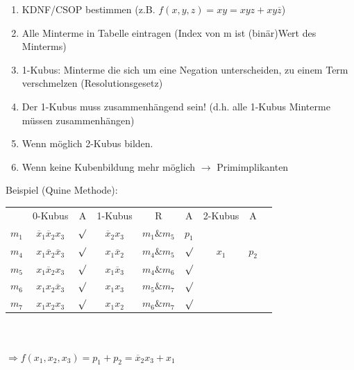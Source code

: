 \documentclass[6pt,a4paper]{scrartcl}
\newcommand{\ol}[1]{\ensuremath{\overline{#1}}}									%
\newcommand{\Ra}[0]{\ensuremath{\Rightarrow}}									%
\newcommand{\ra}[0]{\ensuremath{\rightarrow}} 									%
\begin{document}
\begin{multicols*}{3}
	\begin{enumerate}
		\item KDNF/CSOP bestimmen (z.B. $f(x,y,z) = xy = xyz + xy\overline z$)
		\item Alle Minterme in Tabelle eintragen (Index von m ist (binär)Wert des Minterms)
		\item 1-Kubus: Minterme die sich um eine Negation unterscheiden, zu einem Term verschmelzen (Resolutionsgesetz)
		\item Der 1-Kubus muss zusammenhängend sein! (d.h. alle 1-Kubus Minterme müssen zusammenhängen)
		\item Wenn möglich 2-Kubus bilden.
		\item Wenn keine Kubenbildung mehr möglich $\ra$ Primimplikanten
	\end{enumerate}
	Beispiel (Quine Methode):
	
	\begin{tabular}{l | c | c  || c | c | c || c | c | r}
	      & 0-Kubus & A & 1-Kubus & R & A & 2-Kubus  & A \\
	$m_1$ & $\overline x_1 \overline x_2 x_3$ & $\surd$ & $\overline x_2 x_3$ & $m_1 \& m_5$ & $p_1$ & &\\
	$m_4$ & $x_1 \overline x_2 \overline x_3$ & $\surd$ & $x_1 \overline x_2$ & $m_4 \& m_5$ & $\surd$ & $x_1$ &   $p_2$\\
	$m_5$ & $x_1 \overline x_2  x_3$ & $\surd$  & $x_1 \overline x_3$ & $m_4 \& m_6$ & $\surd$& &\\
	$m_6$ & $x_1 x_2 \overline x_3$ & $ \surd$ & $x_1 x_3$ & $ m_5 \& m_7$ & $ \surd$ & &\\
	$m_7$ & $x_1 x_2 x_3$ & $\surd$ & $x_1 x_2$ & $m_6 \& m_7 $ & $ \surd$ & &\\
	\end{tabular} \\ \\
	$\Ra f(x_1,x_2,x_3)=p_1+p_2=\ol x_2x_3 + x_1$
	

\end{multicols*}
\end{document}
